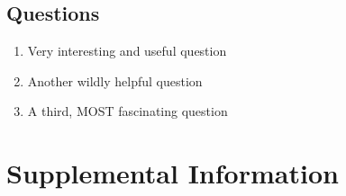 \documentclass[]{article}
\providecommand{\tightlist}{%
  \setlength{\itemsep}{0pt}\setlength{\parskip}{0pt}}
\begin{document}
\newpage

\hypertarget{questions-1}{%
\subsection{Questions}\label{questions-1}}

\begin{enumerate}
\def\labelenumi{\arabic{enumi}.}
\tightlist
\item
  Very interesting and useful question
\item
  Another wildly helpful question
\item
  A third, MOST fascinating question
\end{enumerate}

\newpage

\hypertarget{supplemental-information}{%
\section{Supplemental Information}\label{supplemental-information}}
\end{document}
